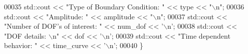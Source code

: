 \begin{DoxyCode}
00035   std::cout << \textcolor{stringliteral}{"Type of Boundary Condition: "} << type << \textcolor{stringliteral}{"\(\backslash\)n"};
00036   std::cout << \textcolor{stringliteral}{"Amplitude: "} << amplitude << \textcolor{stringliteral}{"\(\backslash\)n"};
00037   std::cout << \textcolor{stringliteral}{"Number of DOF's of interest: "} << num\_dof << \textcolor{charliteral}{'\(\backslash\)n'};
00038   std::cout << \textcolor{stringliteral}{"DOF details: \(\backslash\)n"} << dof << \textcolor{charliteral}{'\(\backslash\)n'};
00039   std::cout << \textcolor{stringliteral}{"Time dependent behavior: "} << time\_curve << \textcolor{charliteral}{'\(\backslash\)n'};
00040 \}
\end{DoxyCode}
